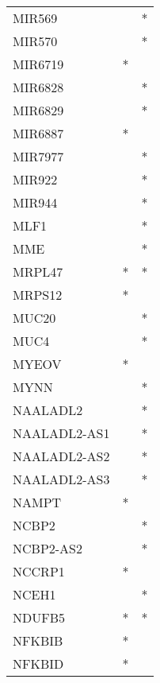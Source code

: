 \begin{longtable}{lcc}
MIR569           &                &          * \\
MIR570           &                &          * \\
MIR6719          &              * &            \\
MIR6828          &                &          * \\
MIR6829          &                &          * \\
MIR6887          &              * &            \\
MIR7977          &                &          * \\
MIR922           &                &          * \\
MIR944           &                &          * \\
MLF1             &                &          * \\
MME              &                &          * \\
MRPL47           &              * &          * \\
MRPS12           &              * &            \\
MUC20            &                &          * \\
MUC4             &                &          * \\
MYEOV            &              * &            \\
MYNN             &                &          * \\
NAALADL2         &                &          * \\
NAALADL2-AS1     &                &          * \\
NAALADL2-AS2     &                &          * \\
NAALADL2-AS3     &                &          * \\
NAMPT            &              * &            \\
NCBP2            &                &          * \\
NCBP2-AS2        &                &          * \\
NCCRP1           &              * &            \\
NCEH1            &                &          * \\
NDUFB5           &              * &          * \\
NFKBIB           &              * &            \\
NFKBID           &              * &            \\

\end{longtable}
